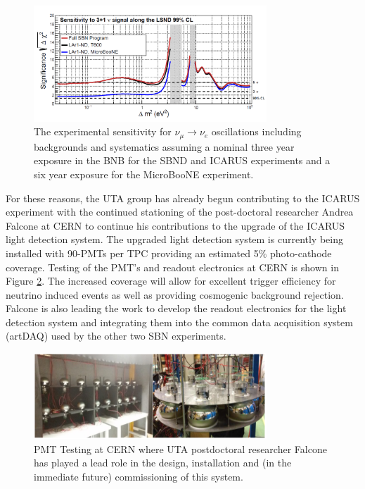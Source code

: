 \begin{figure}[htb]
\centering
\includegraphics[width=0.78\textwidth]{images/Sensitivity.png}
\caption[]{The experimental sensitivity for $\nu_{\mu} \rightarrow \nu_{e}$ oscillations including backgrounds and systematics assuming a nominal three year exposure in the BNB for the SBND and ICARUS experiments and a six year exposure for the MicroBooNE experiment.}
\label{fig:sense}
\end{figure}


For these reasons, the UTA group has already begun contributing to the ICARUS experiment with the continued stationing of the post-doctoral researcher Andrea Falcone at CERN to continue his contributions to the upgrade of the ICARUS light detection system. The upgraded light detection system is currently being installed with 90-PMTs per TPC providing an estimated 5$\%$ photo-cathode coverage. Testing of the PMT's and readout electronics at CERN is shown in Figure \ref{fig:icarusPMT}.  The increased coverage will allow for excellent trigger efficiency for neutrino induced events as well as providing cosmogenic background rejection. Falcone is also leading the work to develop the readout electronics for the light detection system and integrating them into the common data acquisition system (artDAQ) used by the other two SBN experiments.

\begin{figure}[htb]
\centering
\includegraphics[width=0.78\textwidth]{images/ICARUS_PMT_Testing.png}
\caption[]{PMT Testing at CERN where UTA postdoctoral researcher Falcone has played a lead role in the design, installation and (in the immediate future) commissioning of this system.}
\label{fig:icarusPMT}
\end{figure}

